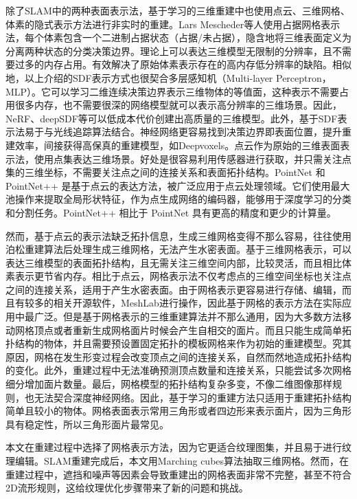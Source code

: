 除了SLAM中的两种表面表示法，基于学习的三维重建中也使用点云、三维网格、体素的隐式表示方法进行非实时的重建。Lars Mescheder等人使用占据网格表示法，每个体素包含一个二进制占据状态（占据/未占据），隐含地将三维表面定义为分离两种状态的分类决策边界。理论上可以表达三维模型无限制的分辨率，且不需要过多的内存占用。有效解决了原始体素表示存在的高内存低分辨率的缺陷。相似地，以上介绍的SDF表示方式也很契合多层感知机（Multi-layer Perceptron，MLP）。它可以学习二维连续决策边界表示三维物体的等值面，这种表示不需要占用很多内存，也不需要很深的网络模型就可以表示高分辨率的三维场景。因此，NeRF、deepSDF等可以低成本代价创建出高质量的三维模型。此外，基于SDF表示法易于与光线追踪算法结合。神经网络更容易找到决策边界即表面位置，提升重建效率，间接获得高保真的重建模型，如Deepvoxels。点云作为原始的三维表面表示法，使用点集表达三维场景。好处是很容易利用传感器进行获取，并只需关注点集的三维坐标，不需要关注点之间的连接关系和表面拓扑结构。PointNet 和 PointNet++ 是基于点云的表达方法，被广泛应用于点云处理领域。它们使用最大池操作来提取全局形状特征，作为点生成网络的编码器，能够用于深度学习的分类和分割任务。PointNet++ 相比于 PointNet 具有更高的精度和更少的计算量。\par


然而，基于点云的表示法缺乏拓扑信息，生成三维网格变得不那么容易，往往使用泊松重建算法后处理生成三维网格，无法产生水密表面。基于三维网格表示，可以表达三维模型的表面拓扑结构，且无需关注三维空间内部，比较灵活，而且相比体素表示更节省内存。相比于点云，网格表示法不仅考虑点的三维空间坐标也关注点之间的连接关系，适用于产生水密表面。由于网格表示更容易进行存储、编辑，而且有较多的相关开源软件，MeshLab进行操作，因此基于网格的表示方法在实际应用中最广泛。但是基于网格表示的三维重建算法并不那么通用，因为大多数方法移动网格顶点或者重新生成网格面片时候会产生自相交的面片。而且只能生成简单拓扑结构的物体，并且需要预设置固定拓扑的模板网格来作为初始的重建模型。究其原因，网格在发生形变过程会改变顶点之间的连接关系，自然而然地造成拓扑结构的变化。此外，重建过程中无法准确预测顶点数量和连接关系，只能尝试多次网格细分增加面片数量。最后，网格模型的拓扑结构复杂多变，不像二维图像那样规则，也无法契合深度神经网络。因此，基于学习的重建方法只适用于重建拓扑结构简单且较小的物体。网格表面表示常用三角形或者四边形来表示面片，因为三角形具有稳定性，所以三角形面片最常见。\par
本文在重建过程中选择了网格表示方法，因为它更适合纹理图集，并且易于进行纹理编辑。SLAM重建完成后，本文用Marching cubes算法抽取三维网格。然而，在重建过程中，遮挡和噪声等因素会导致重建出的网格表面非常不完整，甚至不符合2D流形规则，这给纹理优化步骤带来了新的问题和挑战。

